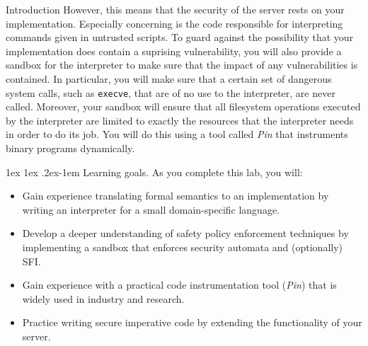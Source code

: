 \documentclass[11pt]{article}
\makeatletter
\renewcommand{\paragraph}{%
  \@startsection{paragraph}{4}%
  {\z@}{1ex \@plus 1ex \@minus .2ex}{-1em}%
  {\normalfont\normalsize\bfseries}
}
\makeatother
\begin{document}
\begin{problem}{Introduction}
    However, this means that the security of the server rests on your implementation. Especially concerning is the code responsible for interpreting commands given in untrusted scripts. 
    To guard against the possibility that your implementation does contain a suprising vulnerability, you will also provide a sandbox for the interpreter to make sure that the impact of any vulnerabilities is contained. In particular, you will make sure that a certain set of dangerous system calls, such as \verb'execve', that are of no use to the interpreter, are never called. Moreover, your sandbox will ensure that all filesystem operations executed by the interpreter are limited to exactly the resources that the interpreter needs in order to do its job. 
    You will do this using a tool called \emph{Pin} that instruments binary programs dynamically.
  
  \paragraph{Learning goals.}
    As you complete this lab, you will:
    \begin{itemize}[noitemsep,topsep=0pt]
      \item Gain experience translating formal semantics to an implementation by writing an interpreter for a small domain-specific language.
      \item Develop a deeper understanding of safety policy enforcement techniques by implementing a sandbox that enforces security automata and (optionally) SFI.
      \item Gain experience with a practical code instrumentation tool (\emph{Pin}) that is widely used in industry and research.
      \item Practice writing secure imperative code by extending the functionality of your server.
    \end{itemize}

\end{problem}
\end{document}
